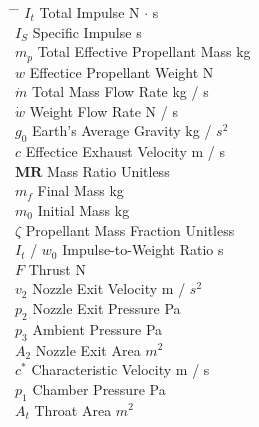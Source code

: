 \documentclass[12pt]{article}
\begin{document}
\begin{tabbing}
\hspace{2cm} \= \hspace{7cm} \= \kill
    $I_t$                  \> Total Impulse                   \> N $\cdot$ s \\
    $I_S$                  \> Specific Impulse                \> s           \\
    $m_p$                  \> Total Effective Propellant Mass \> kg          \\
    $w$                    \> Effectice Propellant Weight     \> N           \\
    $\dot{m}$              \> Total Mass Flow Rate            \> kg / s      \\
    $\dot{w}$              \> Weight Flow Rate                \> N / s       \\
    $g_0$                  \> Earth's Average Gravity         \> kg / $s^2$  \\
    $c$                    \> Effectice Exhaust Velocity      \> m / s       \\
    $\mathbf{M}\mathbf{R}$ \> Mass Ratio                      \> Unitless    \\
    $m_f$                  \> Final Mass                      \> kg          \\
    $m_0$                  \> Initial Mass                    \> kg          \\
    $\zeta$                \> Propellant Mass Fraction        \> Unitless    \\
    $I_t$ / $w_0$          \> Impulse-to-Weight Ratio         \> s           \\
    $F$                    \> Thrust                          \> N           \\
    $v_2$                  \> Nozzle Exit Velocity            \> m / $s^2$   \\
    $p_2$                  \> Nozzle Exit Pressure            \> Pa          \\
    $p_3$                  \> Ambient Pressure                \> Pa          \\
    $A_2$                  \> Nozzle Exit Area                \> $m^2$       \\
    $c^*$                  \> Characteristic Velocity         \> m / s       \\
    $p_1$                  \> Chamber Pressure                \> Pa          \\
    $A_t$                  \> Throat Area                     \> $m^2$       \\
\end{tabbing}
\end{document}
